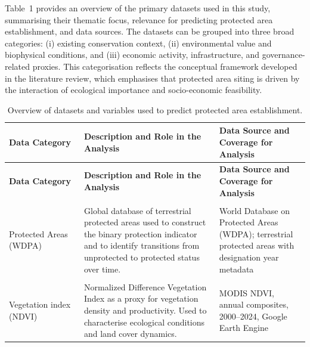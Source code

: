 \documentclass[12pt]{article}
\theoremstyle{break} %
\begin{document}
Table~1 provides an overview of the primary datasets used in this study, summarising their thematic focus, relevance for predicting protected area establishment, and data sources. The datasets can be grouped into three broad categories: (i) existing conservation context, (ii) environmental value and biophysical conditions, and (iii) economic activity, infrastructure, and governance-related proxies. This categorisation reflects the conceptual framework developed in the literature review, which emphasises that protected area siting is driven by the interaction of ecological importance and socio-economic feasibility.
\newline

\begin{longtable}{%
  >{\raggedright\arraybackslash}p{0.25\linewidth}%
  >{\raggedright\arraybackslash}p{0.45\linewidth}%
  >{\raggedright\arraybackslash}p{0.30\linewidth}%
}
\caption{Overview of datasets and variables used to predict protected area establishment.} \\
\toprule
\textbf{Data Category} & \textbf{Description and Role in the Analysis} & \textbf{Data Source and Coverage for Analysis} \\
\midrule
\endfirsthead

\toprule
\textbf{Data Category} & \textbf{Description and Role in the Analysis} & \textbf{Data Source and Coverage for Analysis} \\
\midrule
\endhead

\bottomrule
\endlastfoot

\multicolumn{3}{l}{\textbf{Existing Conservation Context}} \\
\addlinespace
Protected Areas (WDPA) &
Global database of terrestrial protected areas used to construct the binary protection indicator and to identify transitions from unprotected to protected status over time. &
World Database on Protected Areas (WDPA); terrestrial protected areas with designation year metadata \\

\addlinespace\addlinespace

\multicolumn{3}{l}{\textbf{Environmental and Ecological Conditions}} \\
\addlinespace
Vegetation index (NDVI) &
Normalized Difference Vegetation Index as a proxy for vegetation density and productivity. Used to characterise ecological conditions and land cover dynamics. &
MODIS NDVI, annual composites, 2000--2024, Google Earth Engine \\


\end{longtable}
\end{document}
